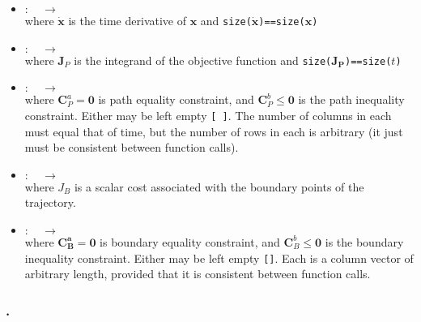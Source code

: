 \begin{itemize} \setlength\itemsep{-0.1em}
\item {}
	${\bm: \quad \to \quad }$
	\\ where $\bm{\dot{x}}$ is the time derivative of $\bm{x}$ and \texttt{size($\bm{\dot{x}}$)==size($\bm{x}$)}
\item {}
	${\bm: \quad \to \quad }$
	\\ where $\bm{J}_P$ is the integrand of the objective function and \texttt{size($\bm{J_P}$)==size($t$)}
\item {}
	${\bm: \quad \to \quad }$
	\tc{$[\bm{C}_P^a, \bm{C}_P^b ]$ = }
	\\ where $\bm{C}_P^a=\bm{0}$ is path equality constraint, and $\bm{C}_P^b \leq \bm{0}$ is the path inequality constraint. Either may be left empty \texttt{[ ]}. 	 	The 	number of columns in each must equal that of time, but the number of rows in each is arbitrary (it just must be consistent between function calls).
\item {}
	${\bm: \quad \to \quad }$
	\\ where $J_B$ is a scalar cost associated with the boundary points of the trajectory. 
\item {}
	${\bm: \quad \to \quad }$
	\tc{$[\bm{C}_B^a, \bm{C}_B^b]$ = }
	\\ where $\bm{C_B^a}=\bm{0}$ is boundary equality constraint, and $\bm{C}_B^b \leq \bm{0}$ is the boundary inequality constraint. Either may be left empty \texttt{[]}. Each is a column vector of arbitrary length, provided that it is consistent between function calls.
\end{itemize}


\subsubsection*{.}

